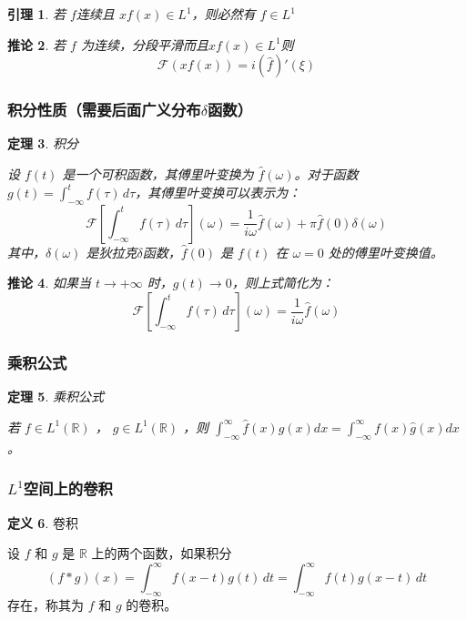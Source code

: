 \documentclass[12pt,a4paper]{article}
\theoremstyle{plain}
\newtheorem{theorem}{定理}[section]
\newtheorem{lemma}[theorem]{引理}
\newtheorem{corollary}[theorem]{推论}  %
\theoremstyle{definition}
\newtheorem{definition}[theorem]{定义}
\theoremstyle{remark}
\begin{document}
\begin{lemma}
若 \( f \)连续且 \( xf(x) \in L^1 \)，则必然有 \( f \in L^1 \)

\end{lemma}

\begin{corollary}
若 \( f \) 为连续，分段平滑而且\( xf(x)  \in L^1\)则
\[
\mathcal{F}(xf(x)) = i (\widehat{f})'(\xi)
\]
  \end{corollary}







 \subsubsection{积分性质（需要后面广义分布$\delta$函数）}
 \begin{theorem}积分
 	
 设 \( f(t) \) 是一个可积函数，其傅里叶变换为 \( \hat{f}(\omega) \)。对于函数 \( g(t) = \int_{-\infty}^{t} f(\tau) \, d\tau \)，其傅里叶变换可以表示为：
 \[
 \mathcal{F}\left[\int_{-\infty}^{t} f(\tau) \, d\tau\right](\omega) = \frac{1}{i\omega} \hat{f}(\omega) + \pi \hat{f}(0) \delta(\omega)
 \]
 其中，\( \delta(\omega) \) 是狄拉克$\delta$函数，\( \hat{f}(0) \) 是 \( f(t) \) 在 \( \omega = 0 \) 处的傅里叶变换值。
 \end{theorem}
 
  \begin{corollary}
如果当 \( t \to +\infty \) 时，\( g(t) \to 0 \)，则上式简化为：
\[
\mathcal{F}\left[\int_{-\infty}^{t} f(\tau) \, d\tau\right](\omega) = \frac{1}{i\omega} \hat{f}(\omega)
\]
  \end{corollary}

 
 
 
 \subsubsection{乘积公式}
\begin{theorem}乘积公式
	
	若 \(f \in L^1(\mathbb{R})\) ， \(g \in L^1(\mathbb{R})\) ，则 \(\int_{-\infty}^{\infty}\hat{f}(x)g(x)dx = \int_{-\infty}^{\infty}f(x)\hat{g}(x)dx\) 。	
\end{theorem}

\subsubsection{$L^1$空间上的卷积}
\begin{definition}卷积
	
	设 \( f \) 和 \( g \) 是 \(\mathbb{R}\) 上的两个函数，如果积分
	\[
	(f * g)(x) = \int_{-\infty}^{\infty} f(x - t) g(t) \, dt = \int_{-\infty}^{\infty} f(t) g(x - t) \, dt
	\]
	存在，称其为 \( f \) 和 \( g \) 的卷积。
\end{definition}
\end{document}
